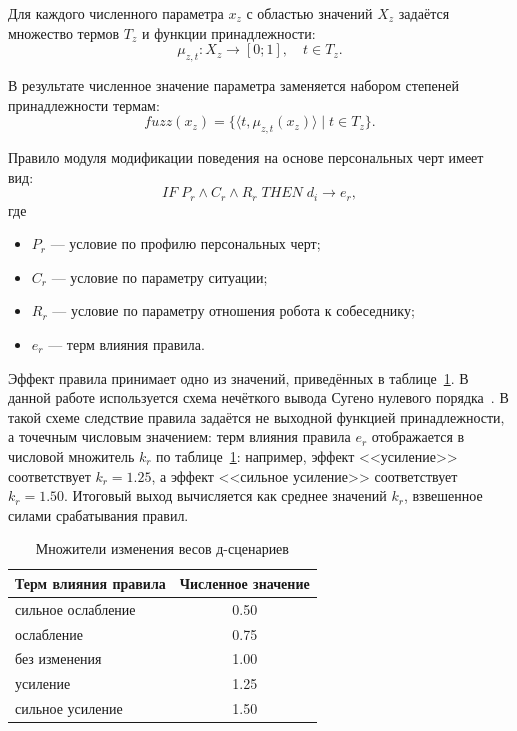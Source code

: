 Для каждого численного параметра \(x_z\) с областью значений \(X_z\) задаётся множество термов \(T_z\) и функции принадлежности:
\begin{equation}
	\label{eq:generic_membership}
	\mu_{z,t}: X_z \rightarrow [0; 1], \quad t \in T_z.
\end{equation}

В результате численное значение параметра заменяется набором степеней принадлежности термам:
\begin{equation}
	\label{eq:fuzzified_feature}
	fuzz(x_z) = \{\langle t, \mu_{z,t}(x_z) \rangle \mid t \in T_z\}.
\end{equation}

Правило модуля модификации поведения на основе персональных черт имеет вид:
\begin{equation}
	\label{eq:rule_template}
	IF\; P_r \land C_r \land R_r\; THEN\; d_i \rightarrow e_r,
\end{equation}
где

\begin{itemize}
	\item \(P_r\) --- условие по профилю персональных черт;
	\item \(C_r\) --- условие по параметру ситуации;
	\item \(R_r\) --- условие по параметру отношения робота к собеседнику;
	\item \(e_r\) --- терм влияния правила.
\end{itemize}

Эффект правила принимает одно из значений, приведённых в таблице~\ref{tbl:multipliers}.
В данной работе используется схема нечёткого вывода Сугено нулевого порядка~\cite{takagi1985fuzzy}.
В такой схеме следствие правила задаётся не выходной функцией принадлежности, а точечным числовым значением:
терм влияния правила \(e_r\) отображается в числовой множитель \(k_r\) по таблице~\ref{tbl:multipliers}: например, эффект <<усиление>> соответствует \(k_r = 1.25\), а эффект <<сильное усиление>> соответствует \(k_r = 1.50\).
Итоговый выход вычисляется как среднее значений \(k_r\), взвешенное силами срабатывания правил.

\begin{table}[H]
	\centering
	\caption{Множители изменения весов д-сценариев}
	\label{tbl:multipliers}
	\begin{tabularx}{\textwidth}{|X|c|}
		\hline
		\textbf{Терм влияния правила} & \textbf{Численное значение} \\
		\hline
		сильное ослабление & 0.50 \\
		\hline
		ослабление & 0.75 \\
		\hline
		без изменения & 1.00 \\
		\hline
		усиление & 1.25 \\
		\hline
		сильное усиление & 1.50 \\
		\hline
	\end{tabularx}
\end{table}

